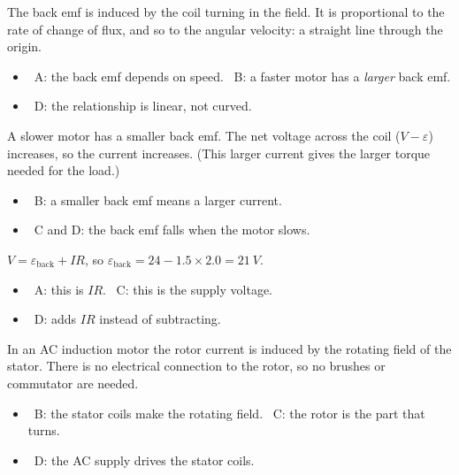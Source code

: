 \documentclass[12pt]{article}
\begin{document}
\begin{practiceanswers}
\begin{practiceans}
  The back emf is induced by the coil turning in the field. It is proportional to the rate of change of
  flux, and so to the angular velocity: a straight line through the origin.
  \begin{itemize}
    \item \xmark\ A: the back emf depends on speed. \quad \xmark\ B: a faster motor has a \emph{larger}
          back emf.
    \item \xmark\ D: the relationship is linear, not curved.
  \end{itemize}
\end{practiceans}

\begin{practiceans}
  A slower motor has a smaller back emf. The net voltage across the coil ($V - \varepsilon$) increases,
  so the current increases. (This larger current gives the larger torque needed for the load.)
  \begin{itemize}
    \item \xmark\ B: a smaller back emf means a larger current.
    \item \xmark\ C and D: the back emf falls when the motor slows.
  \end{itemize}
\end{practiceans}

\begin{practiceans}
  $V = \varepsilon_\mathrm{back} + IR$, so $\varepsilon_\mathrm{back} = 24 - 1.5 \times 2.0 = \qty{21}{V}$.
  \begin{itemize}
    \item \xmark\ A: this is $IR$. \quad \xmark\ C: this is the supply voltage.
    \item \xmark\ D: adds $IR$ instead of subtracting.
  \end{itemize}
\end{practiceans}

\begin{practiceans}
  In an AC induction motor the rotor current is induced by the rotating field of the stator. There is
  no electrical connection to the rotor, so no brushes or commutator are needed.
  \begin{itemize}
    \item \xmark\ B: the stator coils make the rotating field. \quad \xmark\ C: the rotor is the part that
          turns.
    \item \xmark\ D: the AC supply drives the stator coils.
  \end{itemize}
\end{practiceans}


\end{practiceanswers}
\end{document}
